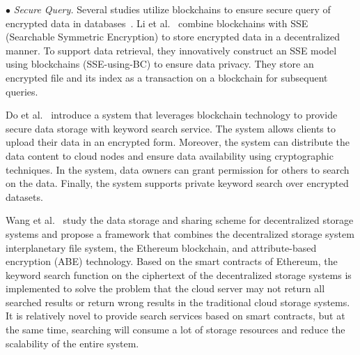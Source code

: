 \documentclass[acmsmall]{acmart}
\begin{document}
$\bullet$ {\it Secure Query. }
Several studies utilize blockchains to ensure secure query of encrypted data in databases~\cite{li2017searchable,do2017blockchain}. Li et al.~\cite{li2017searchable} combine blockchains with SSE (Searchable Symmetric Encryption) to store encrypted data in a decentralized manner. To support data retrieval, they innovatively construct an SSE model using blockchains (SSE-using-BC) to ensure data privacy. They store an encrypted file and its index as a transaction on a blockchain for subsequent queries.


Do et al.~\cite{do2017blockchain} introduce a system that leverages blockchain technology to provide secure data storage with keyword search service. The system allows clients to upload their data in an encrypted form. Moreover, the system can distribute the data content to cloud nodes and ensure data availability using cryptographic techniques. In the system, data owners can grant permission for others to search on the data. Finally, the system supports private keyword search over encrypted datasets.


Wang et al.~\cite{wang2018blockchain} study the data storage and sharing scheme for decentralized storage systems and propose a framework that combines the decentralized storage system interplanetary file system, the Ethereum blockchain, and attribute-based encryption (ABE) technology. Based on the smart contracts of Ethereum, the keyword search function on the ciphertext of the decentralized storage systems is implemented to solve the problem that the cloud server may not return all searched results or return wrong results in the traditional cloud storage systems. It is relatively novel to provide search services based on smart contracts, but at the same time, searching will consume a lot of storage resources and reduce the scalability of the entire system.
\end{document}
